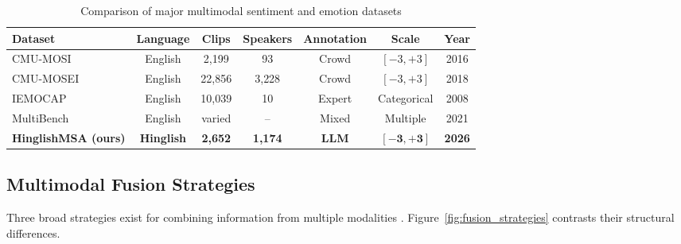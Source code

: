 \begin{table}[ht]
\centering
\caption{Comparison of major multimodal sentiment and emotion datasets}
\label{tab:msa_datasets}
\renewcommand{\arraystretch}{1.3}
\begin{tabular}{lcccccc}
\toprule
\textbf{Dataset} & \textbf{Language} & \textbf{Clips} & \textbf{Speakers} & \textbf{Annotation} & \textbf{Scale} & \textbf{Year} \\
\midrule
CMU-MOSI \cite{zadeh2016mosi}        & English  & 2{,}199  & 93   & Crowd   & $[-3,+3]$     & 2016 \\
CMU-MOSEI \cite{zadeh2018multimodal} & English  & 22{,}856 & 3{,}228 & Crowd & $[-3,+3]$     & 2018 \\
IEMOCAP \cite{busso2008iemocap}      & English  & 10{,}039 & 10   & Expert  & Categorical   & 2008 \\
MultiBench \cite{liang2021multibench} & English & varied   & --   & Mixed   & Multiple      & 2021 \\
\midrule
\textbf{HinglishMSA (ours)} & \textbf{Hinglish} & \textbf{2{,}652} & \textbf{1{,}174} & \textbf{LLM} & $\mathbf{[-3,+3]}$ & \textbf{2026} \\
\bottomrule
\end{tabular}
\end{table}

\subsection{Multimodal Fusion Strategies}

Three broad strategies exist for combining information from multiple modalities \cite{guo2023recent}. Figure~\ref{fig:fusion_strategies} contrasts their structural differences.

